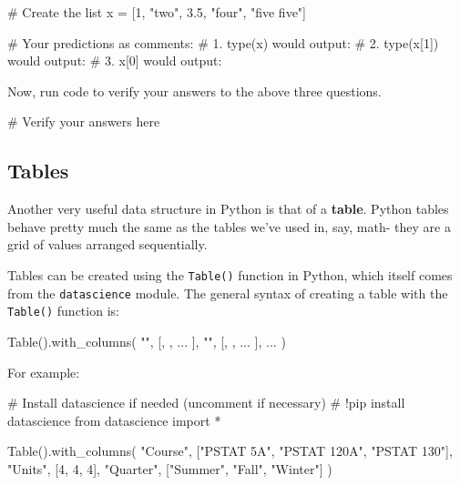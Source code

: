 \documentclass[
  11pt,
]{article}
\newenvironment{Shaded}{\begin{snugshade}}{\end{snugshade}}
\newcommand{\CommentTok}[1]{\textcolor[rgb]{0.37,0.37,0.37}{#1}}
\newcommand{\DecValTok}[1]{\textcolor[rgb]{0.68,0.00,0.00}{#1}}
\newcommand{\FloatTok}[1]{\textcolor[rgb]{0.68,0.00,0.00}{#1}}
\newcommand{\ImportTok}[1]{\textcolor[rgb]{0.00,0.46,0.62}{#1}}
\newcommand{\NormalTok}[1]{\textcolor[rgb]{0.00,0.23,0.31}{#1}}
\newcommand{\OperatorTok}[1]{\textcolor[rgb]{0.37,0.37,0.37}{#1}}
\newcommand{\StringTok}[1]{\textcolor[rgb]{0.13,0.47,0.30}{#1}}
\begin{document}
\begin{Shaded}
\begin{Highlighting}[]
\CommentTok{\# Create the list}
\NormalTok{x }\OperatorTok{=}\NormalTok{ [}\DecValTok{1}\NormalTok{, }\StringTok{"two"}\NormalTok{, }\FloatTok{3.5}\NormalTok{, }\StringTok{"four"}\NormalTok{, }\StringTok{"five five"}\NormalTok{]}

\CommentTok{\# Your predictions as comments:}
\CommentTok{\# 1. type(x) would output: }
\CommentTok{\# 2. type(x[1]) would output: }
\CommentTok{\# 3. x[0] would output: }
\end{Highlighting}
\end{Shaded}

Now, run code to verify your answers to the above three questions.

\begin{Shaded}
\begin{Highlighting}[]
\CommentTok{\# Verify your answers here}
\end{Highlighting}
\end{Shaded}

\subsection{Tables}\label{tables}

Another very useful data structure in Python is that of a
\textbf{table}. Python tables behave pretty much the same as the tables
we've used in, say, math- they are a grid of values arranged
sequentially.

Tables can be created using the \texttt{Table()} function in Python,
which itself comes from the \texttt{datascience} module. The general
syntax of creating a table with the \texttt{Table()} function is:

\begin{Shaded}
\begin{Highlighting}[]
\NormalTok{Table().with\_columns(}
  \StringTok{""}\NormalTok{, [, , ... ],}
  \StringTok{""}\NormalTok{, [, , ... ],}
\NormalTok{  ...}
\NormalTok{)}
\end{Highlighting}
\end{Shaded}

For example:

\begin{Shaded}
\begin{Highlighting}[]
\CommentTok{\# Install datascience if needed (uncomment if necessary)}
\CommentTok{\# !pip install datascience}
\ImportTok{from}\NormalTok{ datascience }\ImportTok{import} \OperatorTok{*}

\NormalTok{Table().with\_columns(}
  \StringTok{"Course"}\NormalTok{, [}\StringTok{"PSTAT 5A"}\NormalTok{, }\StringTok{"PSTAT 120A"}\NormalTok{, }\StringTok{"PSTAT 130"}\NormalTok{],}
  \StringTok{"Units"}\NormalTok{, [}\DecValTok{4}\NormalTok{, }\DecValTok{4}\NormalTok{, }\DecValTok{4}\NormalTok{],}
  \StringTok{"Quarter"}\NormalTok{, [}\StringTok{"Summer"}\NormalTok{, }\StringTok{"Fall"}\NormalTok{, }\StringTok{"Winter"}\NormalTok{]}
\NormalTok{)}
\end{Highlighting}
\end{Shaded}
\end{document}
